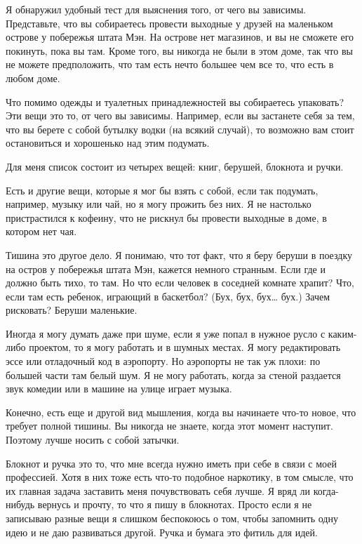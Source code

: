 \documentclass[ebook,12pt,oneside,openany]{memoir}
\begin{document}
\maketitle

Я обнаружил удобный тест для выяснения того, от чего вы зависимы.
Представьте, что вы собираетесь провести выходные у друзей на
маленьком острове у побережья штата Мэн. На острове нет магазинов, и
вы не сможете его покинуть, пока вы там. Кроме того, вы никогда не
были в этом доме, так что вы не можете предположить, что там есть
нечто большее чем все то, что есть в любом доме.

Что помимо одежды и туалетных принадлежностей вы собираетесь
упаковать? Эти вещи это то, от чего вы зависимы. Например, если вы
застанете себя за тем, что вы берете с собой бутылку водки (на всякий
случай), то возможно вам стоит остановиться и хорошенько над этим
подумать.

Для меня список состоит из четырех вещей: книг, берушей, блокнота и
ручки.

Есть и другие вещи, которые я мог бы взять с собой, если так подумать,
например, музыку или чай, но я могу прожить без них. Я не настолько
пристрастился к кофеину, что не рискнул бы провести выходные в доме, в
котором нет чая.

Тишина это другое дело. Я понимаю, что тот факт, что я беру беруши в
поездку на остров у побережья штата Мэн, кажется немного странным.
Если где и должно быть тихо, то там. Но что если человек в соседней
комнате храпит? Что, если там есть ребенок, играющий в баскетбол?
(Бух, бух, бух… бух.) Зачем рисковать? Беруши маленькие.

Иногда я могу думать даже при шуме, если я уже попал в нужное русло с
каким-либо проектом, то я могу работать и в шумных местах. Я могу
редактировать эссе или отладочный код в аэропорту. Но аэропорты не так
уж плохи: по большей части там белый шум. Я не могу работать, когда за
стеной раздается звук комедии или в машине на улице играет музыка.

Конечно, есть еще и другой вид мышления, когда вы начинаете что-то
новое, что требует полной тишины. Вы никогда не знаете, когда этот
момент наступит. Поэтому лучше носить с собой затычки.

Блокнот и ручка это то, что мне всегда нужно иметь при себе в связи с
моей профессией. Хотя в них тоже есть что-то подобное наркотику, в том
смысле, что их главная задача заставить меня почувствовать себя лучше.
Я вряд ли когда-нибудь вернусь и прочту, то что я пишу в блокнотах.
Просто если я не записываю разные вещи я слишком беспокоюсь о том,
чтобы запомнить одну идею и не даю развиваться другой. Ручка и бумага
это фитиль для идей.
\end{document}
